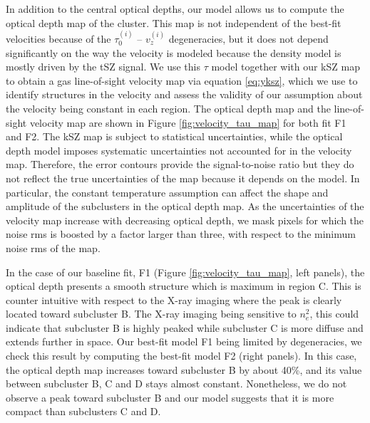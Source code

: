 \documentclass[twocolumn,traditabstract]{aa}
\begin{document}
In addition to the central optical depths, our model allows us to compute the optical depth map of the cluster. This map is not independent of the best-fit velocities because of the $\tau_0^{(i)}$ -- $v_z^{(i)}$ degeneracies, but it does not depend significantly on the way the velocity is modeled because the density model is mostly driven by the tSZ signal. We use this $\tau$ model together with our kSZ map to obtain a gas line-of-sight velocity map via equation \ref{eq:yksz}, which we use to identify structures in the velocity and assess the validity of our assumption about the velocity being constant in each region. The optical depth map and the line-of-sight velocity map are shown in Figure  \ref{fig:velocity_tau_map} for both fit F1 and F2. The kSZ map is subject to statistical uncertainties, while the optical depth model imposes systematic uncertainties not accounted for in the velocity map. Therefore, the error contours provide the signal-to-noise ratio but they do not reflect the true uncertainties of the map because it depends on the model. In particular, the constant temperature assumption can affect the shape and amplitude of the subclusters in the optical depth map. As the uncertainties of the velocity map increase with decreasing optical depth, we mask pixels for which the noise rms is boosted by a factor larger than three, with respect to the minimum noise rms of the map.

In the case of our baseline fit, F1 (Figure  \ref{fig:velocity_tau_map}, left panels), the optical depth presents a smooth structure which is maximum in region C. This is counter intuitive with respect to the X-ray imaging where the peak is clearly located toward subcluster B. The X-ray imaging being sensitive to $n_e^2$, this could indicate that subcluster B is highly peaked while subcluster C is more diffuse and extends further in space. Our best-fit model F1 being limited by degeneracies, we check this result by computing the best-fit model F2 (right panels). In this case, the optical depth map increases toward subcluster B by about 40\%, and its value between subcluster B, C and D stays almost constant. Nonetheless, we do not observe a peak toward subcluster B and our model suggests that it is more compact than subclusters C and D.
\end{document}
